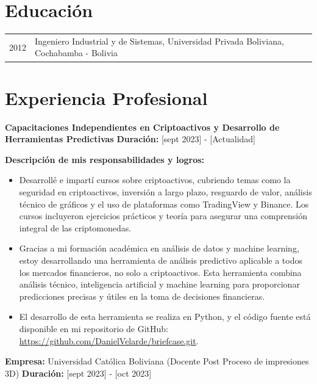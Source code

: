 \documentclass[a4paper,10pt]{article}
\begin{document}
\section*{Educación}
\begin{tabular}{p{3cm}p{12cm}}
    2012 & Ingeniero Industrial y de Sistemas, Universidad Privada Boliviana, Cochabamba - Bolivia \\
\end{tabular}

\section*{Experiencia Profesional}

\textbf{Capacitaciones Independientes en Criptoactivos y Desarrollo de Herramientas Predictivas}  
\textbf{Duración:} [sept 2023] - [Actualidad]

\textbf{Descripción de mis responsabilidades y logros:}
\begin{itemize}
    \item Desarrollé e impartí cursos sobre criptoactivos, cubriendo temas como la seguridad en criptoactivos, inversión a largo plazo, resguardo de valor, análisis técnico de gráficos y el uso de plataformas como TradingView y Binance. Los cursos incluyeron ejercicios prácticos y teoría para asegurar una comprensión integral de las criptomonedas.
    \item Gracias a mi formación académica en análisis de datos y machine learning, estoy desarrollando una herramienta de análisis predictivo aplicable a todos los mercados financieros, no solo a criptoactivos. Esta herramienta combina análisis técnico, inteligencia artificial y machine learning para proporcionar predicciones precisas y útiles en la toma de decisiones financieras.
    \item El desarrollo de esta herramienta se realiza en Python, y el código fuente está disponible en mi repositorio de GitHub: \url{https://github.com/DanielVelarde/briefcase.git}.
\end{itemize}

\textbf{Empresa:} Universidad Católica Boliviana (Docente Post Proceso de impresiones 3D)  
\textbf{Duración:} [sept 2023] - [oct 2023]
\end{document}
